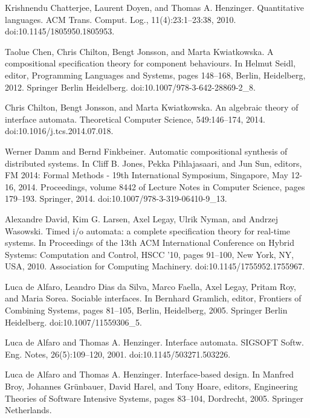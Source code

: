 \par\noindent  [8]  Krishnendu Chatterjee, Laurent Doyen, and Thomas A. Henzinger.  Quantitative languages.  ACM Trans. Comput. Log., 11(4):23:1–23:38, 2010.  doi:10.1145/1805950.1805953.  
 
\par\noindent  [9]  Taolue Chen, Chris Chilton, Bengt Jonsson, and Marta Kwiatkowska.  A compositional specification theory for component behaviours.  In Helmut Seidl, editor, Programming Languages and Systems, pages 148–168, Berlin, Heidelberg, 2012. Springer Berlin Heidelberg.  doi:10.1007/978-3-642-28869-2\_8.  
 
\par\noindent  [10]  Chris Chilton, Bengt Jonsson, and Marta Kwiatkowska.  An algebraic theory of interface automata.  Theoretical Computer Science, 549:146–174, 2014.  doi:10.1016/j.tcs.2014.07.018.  
 
\par\noindent  [11]  Werner Damm and Bernd Finkbeiner.  Automatic compositional synthesis of distributed systems.  In Cliff B. Jones, Pekka Pihlajasaari, and Jun Sun, editors, FM 2014: Formal Methods - 19th International Symposium, Singapore, May 12-16, 2014. Proceedings, volume 8442 of Lecture Notes in Computer Science, pages 179–193. Springer, 2014.  doi:10.1007/978-3-319-06410-9\_13.  
 
\par\noindent  [12]  Alexandre David, Kim G. Larsen, Axel Legay, Ulrik Nyman, and Andrzej Wasowski.  Timed i/o automata: a complete specification theory for real-time systems.  In Proceedings of the 13th ACM International Conference on Hybrid Systems: Computation and Control, HSCC ’10, pages 91–100, New York, NY, USA, 2010. Association for Computing Machinery.  doi:10.1145/1755952.1755967.  
 
\par\noindent  [13]  Luca de Alfaro, Leandro Dias da Silva, Marco Faella, Axel Legay, Pritam Roy, and Maria Sorea.  Sociable interfaces.  In Bernhard Gramlich, editor, Frontiers of Combining Systems, pages 81–105, Berlin, Heidelberg, 2005. Springer Berlin Heidelberg.  doi:10.1007/11559306\_5.  
 
\par\noindent  [14]  Luca de Alfaro and Thomas A. Henzinger.  Interface automata.  SIGSOFT Softw. Eng. Notes, 26(5):109–120, 2001.  doi:10.1145/503271.503226.  
 
\par\noindent  [15]  Luca de Alfaro and Thomas A. Henzinger.  Interface-based design.  In Manfred Broy, Johannes Grünbauer, David Harel, and Tony Hoare, editors, Engineering Theories of Software Intensive Systems, pages 83–104, Dordrecht, 2005. Springer Netherlands.  
 
